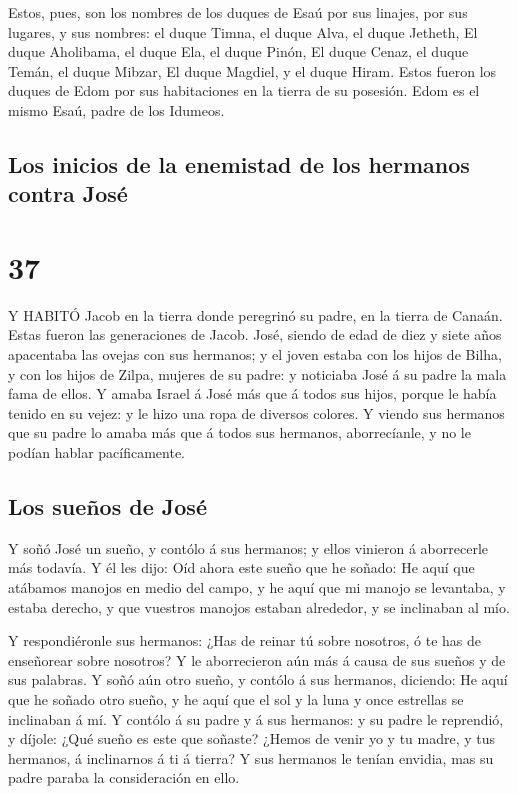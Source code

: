  Estos, pues, son los nombres de los duques de Esaú por sus
linajes, por sus lugares, y sus nombres: el duque Timna, el duque Alva,
el duque Jetheth,  El duque Aholibama, el duque Ela, el
duque Pinón,  El duque Cenaz, el duque Temán, el duque
Mibzar,  El duque Magdiel, y el duque Hiram. Estos fueron
los duques de Edom por sus habitaciones en la tierra de su posesión.
Edom es el mismo Esaú, padre de los Idumeos.

\hypertarget{los-inicios-de-la-enemistad-de-los-hermanos-contra-josuxe9}{%
\subsection{Los inicios de la enemistad de los hermanos contra
José}\label{los-inicios-de-la-enemistad-de-los-hermanos-contra-josuxe9}}

\hypertarget{section-36}{%
\section{37}\label{section-36}}

 Y HABITÓ Jacob en la tierra donde peregrinó su padre, en la
tierra de Canaán.  Estas fueron las generaciones de Jacob.
José, siendo de edad de diez y siete años apacentaba las ovejas con sus
hermanos; y el joven estaba con los hijos de Bilha, y con los hijos de
Zilpa, mujeres de su padre: y noticiaba José á su padre la mala fama de
ellos.  Y amaba Israel á José más que á todos sus hijos,
porque le había tenido en su vejez: y le hizo una ropa de diversos
colores.  Y viendo sus hermanos que su padre lo amaba más
que á todos sus hermanos, aborrecíanle, y no le podían hablar
pacíficamente.

\hypertarget{los-sueuxf1os-de-josuxe9}{%
\subsection{Los sueños de José}\label{los-sueuxf1os-de-josuxe9}}

 Y soñó José un sueño, y contólo á sus hermanos; y ellos
vinieron á aborrecerle más todavía.  Y él les dijo: Oíd
ahora este sueño que he soñado:  He aquí que atábamos
manojos en medio del campo, y he aquí que mi manojo se levantaba, y
estaba derecho, y que vuestros manojos estaban alrededor, y se
inclinaban al mío.

 Y respondiéronle sus hermanos: ¿Has de reinar tú sobre
nosotros, ó te has de enseñorear sobre nosotros? Y le aborrecieron aún
más á causa de sus sueños y de sus palabras.  Y soñó aún
otro sueño, y contólo á sus hermanos, diciendo: He aquí que he soñado
otro sueño, y he aquí que el sol y la luna y once estrellas se
inclinaban á mí.  Y contólo á su padre y á sus hermanos: y
su padre le reprendió, y díjole: ¿Qué sueño es este que soñaste? ¿Hemos
de venir yo y tu madre, y tus hermanos, á inclinarnos á ti á tierra?
 Y sus hermanos le tenían envidia, mas su padre paraba la
consideración en ello.

